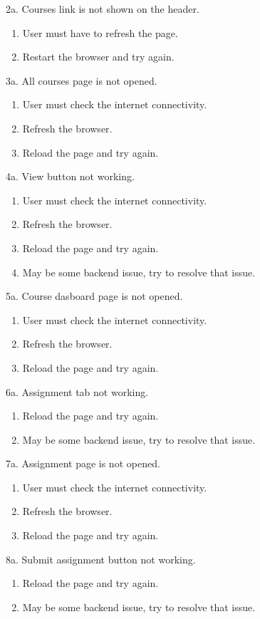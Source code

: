 2a. Courses link is not shown on the header.
\begin{enumerate}
\item User must have to refresh the page.
\item Restart the browser and try again.
\end{enumerate} 
3a. All courses page is not opened.
\begin{enumerate}
\item User must check the internet connectivity.
\item Refresh the browser.
\item Reload the page and try again.
\end{enumerate}
4a. View button not working.
\begin{enumerate}
\item User must check the internet connectivity.
\item Refresh the browser.
\item Reload the page and try again.
\item May be some backend issue, try to resolve that issue.
\end{enumerate}
5a. Course dasboard page is not opened.
\begin{enumerate}
\item User must check the internet connectivity.
\item Refresh the browser.
\item Reload the page and try again.
\end{enumerate}
6a. Assignment tab not working.
\begin{enumerate}
\item Reload the page and try again.
\item May be some backend issue, try to resolve that issue.
\end{enumerate}
7a. Assignment page is not opened.
\begin{enumerate}
\item User must check the internet connectivity.
\item Refresh the browser.
\item Reload the page and try again.
\end{enumerate}
8a. Submit assignment button not working.
\begin{enumerate}
\item Reload the page and try again.
\item May be some backend issue, try to resolve that issue.
\end{enumerate}
